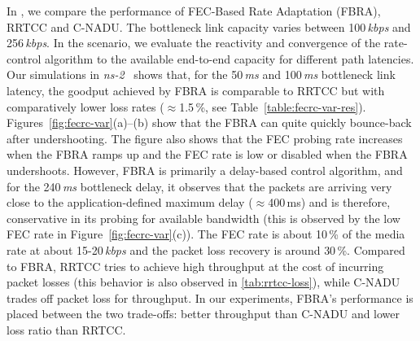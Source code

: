 In , we compare the performance of FEC-Based Rate Adaptation
(FBRA), RRTCC and C-NADU. The bottleneck link capacity varies between
100\,\emph{kbps} and 256\,\emph{kbps}. In the scenario, we evaluate the
reactivity and convergence of the rate-control algorithm to the available 
end-to-end capacity for different path latencies. Our simulations in
\emph{ns-2}~\cite{ns2} shows that, for the 50\,\emph{ms} and 100\,\emph{ms}
bottleneck link latency, the goodput achieved by FBRA is comparable to RRTCC
but with comparatively lower loss rates ($\approx$1.5\,\%, see
Table~\ref{table:fecrc-var-res}). Figures~\ref{fig:fecrc-var}(a)--(b) show
that the FBRA can quite quickly bounce-back after undershooting. The figure
also shows that the FEC probing rate increases when the FBRA ramps up and the
FEC rate is low or disabled when the FBRA undershoots. However, FBRA is
primarily a delay-based control algorithm, and for the 240\,\emph{ms} bottleneck
delay, it observes that the packets are arriving very close to the 
application-defined maximum delay ($\approx$400\,ms) and is therefore, conservative in its
probing for available bandwidth (this is observed by the low FEC rate in
Figure~\ref{fig:fecrc-var}(c)). The FEC rate is about 10\,\% of the media rate at
about 15-20\,\emph{kbps} and the packet loss recovery is around 30\,\%.
Compared to FBRA, RRTCC tries to achieve high throughput at the cost of
incurring packet losses (this behavior is also observed in \ref{tab:rrtcc-loss}), 
while C-NADU trades off packet loss for throughput. In our
experiments, FBRA's performance is placed between the two trade-offs: better
throughput than C-NADU and lower loss ratio than RRTCC.


